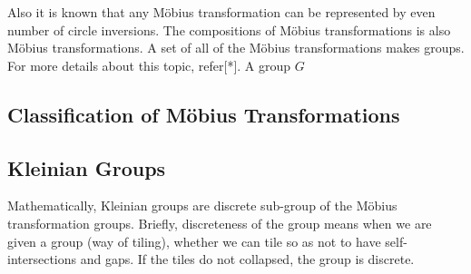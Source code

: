 Also it is known that any M\"obius transformation can be represented by 
even number of circle inversions.
The compositions of M\"obius transformations is also M\"obius
transformations. A set of all of the M\"obius transformations makes
groups. For more details about this topic, refer[*].
A group $G$









\subsection{Classification of M\"obius Transformations}

\subsection{Kleinian Groups}

Mathematically, Kleinian groups are discrete sub-group of the M\"obius
transformation groups.  Briefly, discreteness of the group means when we
are given a group (way of tiling), whether we can tile so as not to have
self-intersections and gaps.  If the tiles do not collapsed, the group
is discrete.
